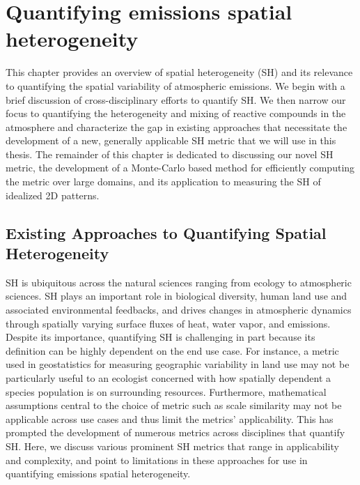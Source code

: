 \chapter{Quantifying emissions spatial heterogeneity}

This chapter provides an overview of spatial heterogeneity (SH) and its relevance to quantifying the spatial variability of atmospheric emissions. We begin with a brief discussion of cross-disciplinary efforts to quantify SH. We then narrow our focus to quantifying the heterogeneity and mixing of reactive compounds in the atmosphere and characterize the gap in existing approaches that necessitate the development of a new, generally applicable SH metric that we will use in this thesis. The remainder of this chapter is dedicated to discussing our novel SH metric, the development of a Monte-Carlo based method for efficiently computing the metric over large domains, and its application to measuring the SH of idealized 2D patterns.  

\section{Existing Approaches to Quantifying Spatial Heterogeneity}
SH is ubiquitous across the natural sciences ranging from ecology to atmospheric sciences. SH plays an important role in biological diversity, human land use and associated environmental feedbacks, and drives changes in atmospheric dynamics through spatially varying surface fluxes of heat, water vapor, and emissions. Despite its importance, quantifying SH is challenging in part because its definition can be highly dependent on the end use case. For instance, a metric used in geostatistics for measuring geographic variability in land use may not be particularly useful to an ecologist concerned with how spatially dependent a species population is on surrounding resources. Furthermore, mathematical assumptions central to the choice of metric such as scale similarity may not be applicable across use cases and thus limit the metrics' applicability. This has prompted the development of numerous metrics across disciplines that quantify SH. Here, we discuss various prominent SH metrics that range in applicability and complexity, and point to limitations in these approaches for use in quantifying emissions spatial heterogeneity. 

